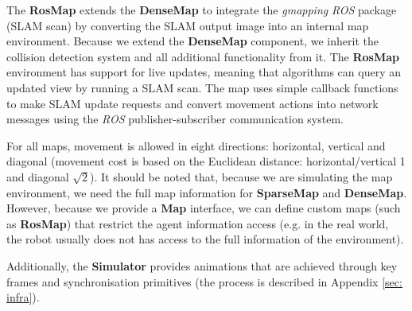 

The \textbf{RosMap} extends the \textbf{DenseMap} to integrate the \textit{gmapping} \textit{ROS} package (SLAM scan) by converting the SLAM output image into an internal map environment. Because we extend the \textbf{DenseMap} component, we inherit the collision detection system and all additional functionality from it. The \textbf{RosMap} environment has support for live updates, meaning that algorithms can query an updated view by running a SLAM scan. The map uses simple callback functions to make SLAM update requests and convert movement actions into network messages using the \textit{ROS} publisher-subscriber communication system.

For all maps, movement is allowed in eight directions: horizontal, vertical and diagonal (movement cost is based on the Euclidean distance: horizontal/vertical 1 and diagonal $\sqrt{2}$). It should be noted that, because we are simulating the map environment, we need the full map information for \textbf{SparseMap} and \textbf{DenseMap}. However, because we provide a \textbf{Map} interface, we can define custom maps (such as \textbf{RosMap}) that restrict the agent information access (e.g. in the real world, the robot usually does not has access to the full information of the environment).

Additionally, the \textbf{Simulator} provides animations that are achieved through key frames and synchronisation primitives (the process is described in Appendix \ref{sec: infra}).

